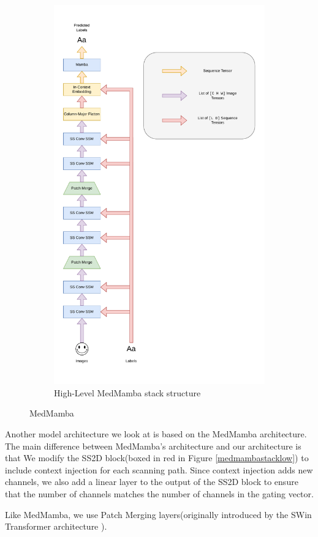 \begin{figure}[ht]
\begin{subfigure}{0.5\textwidth}
        \includegraphics[width=\textwidth]{figures/medmamba_stack.pdf}
        \caption{High-Level MedMamba stack structure}
        \label{medmambastackhigh}
    \end{subfigure}
    \caption{MedMamba}
    \label{medmambastack}
\end{figure}
Another model architecture we look at is based on the MedMamba
architecture\cite{medmamba}.
The main difference between MedMamba's architecture and our architecture is that
We modify the SS2D block(boxed in red in Figure \ref{medmambastacklow}) to include context injection for each scanning
path.
Since context injection adds new channels, we also add a linear layer to the
output of the SS2D block to ensure that the number of channels matches the
number of channels in the gating vector.

Like MedMamba, we use Patch Merging layers(originally introduced by the SWin
Transformer architecture \cite{swintrans}).
